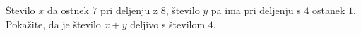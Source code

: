 \documentclass[addpoints]{exam}
\begin{document}
\begin{questions}
    

    \question[3]
    Število $x$ da ostnek $7$ pri deljenju z $8$, število $y$ pa ima pri deljenju s $4$ ostanek $1$. 
    Pokažite, da je število $x+y$ deljivo s številom $4$.

    
    \begin{solution}[4cm]

    \end{solution}

        







\end{questions}
\end{document}
